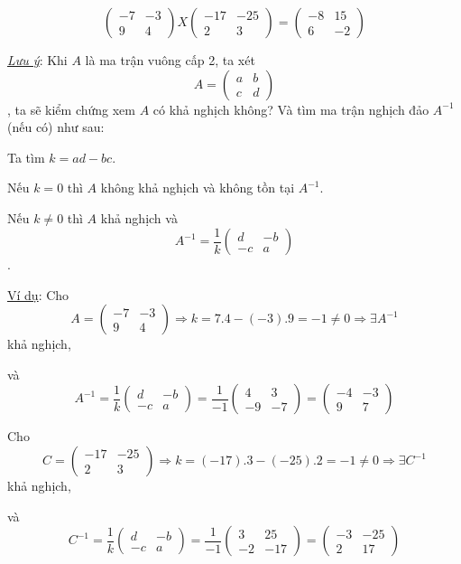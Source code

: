 \documentclass[
]{article}
\let\ul\uline
\begin{document}
$$\begin{pmatrix} -7 & -3 \\ 9 & 4 \end{pmatrix} X \begin{pmatrix} -17 & -25 \\ 2 & 3 \end{pmatrix} = \begin{pmatrix} -8 & 15 \\ 6 & -2 \end{pmatrix}$$

\emph{\ul{Lưu ý}}: Khi
$A$ là ma trận
vuông cấp 2, ta xét
$$A = \begin{pmatrix} a & b \\ c & d \end{pmatrix}$$, ta sẽ kiểm
chứng xem $A$ có
khả nghịch không? Và tìm ma trận nghịch đảo
$A^{-1}$ (nếu có) như
sau:

Ta tìm $k = ad - bc$.

Nếu $k = 0$ thì
$A$ không khả
nghịch và không tồn tại
$A^{-1}$.

Nếu $k \neq 0$ thì
$A$ khả nghịch và
$$A^{-1} = \frac{1}{k} \begin{pmatrix} d & -b \\ -c & a \end{pmatrix}$$.

\ul{Ví dụ}: Cho $$A = \begin{pmatrix} -7 & -3 \\ 9 & 4 \end{pmatrix} \Rightarrow k = 7.4 - (-3).9 = -1 \neq 0 \Rightarrow \exists A^{-1}$$
khả nghịch,

và $$A^{-1} = \frac{1}{k} \begin{pmatrix} d & -b \\ -c & a \end{pmatrix} = \frac{1}{-1} \begin{pmatrix} 4 & 3 \\ -9 & -7 \end{pmatrix} = \begin{pmatrix} -4 & -3 \\ 9 & 7 \end{pmatrix}$$

Cho $$C = \begin{pmatrix} -17 & -25 \\ 2 & 3 \end{pmatrix} \Rightarrow k = (-17).3 - (-25).2 = -1 \neq 0 \Rightarrow \exists C^{-1}$$ khả nghịch,

và $$C^{-1} = \frac{1}{k} \begin{pmatrix} d & -b \\ -c & a \end{pmatrix} = \frac{1}{-1} \begin{pmatrix} 3 & 25 \\ -2 & -17 \end{pmatrix} = \begin{pmatrix} -3 & -25 \\ 2 & 17 \end{pmatrix}$$
\end{document}
